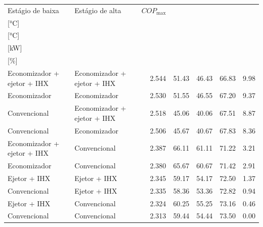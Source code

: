 {\small\setlength{\tabcolsep}{4pt}\renewcommand{\arraystretch}{1.12}
\begin{tabular}{llrrrrr}
\toprule
Estágio de baixa & Estágio de alta & $COP_{\max}$ & \shortstack{$T_{\mathrm{cond,l}}^*$\\{[°C]}} & \shortstack{$T_{\mathrm{evap,h}}^*$\\{[°C]}} & \shortstack{$\dot W_{\mathrm{liq}}$\\{[kW]}} & \shortstack{$\Delta COP_{\mathrm{opt}}$\\{[\%]}} \\
\midrule
Economizador + ejetor + IHX & Economizador + ejetor + IHX & 2.544 & 51.43 & 46.43 & 66.83 & 9.98 \\
Economizador & Economizador & 2.530 & 51.55 & 46.55 & 67.20 & 9.37 \\
Convencional & Economizador + ejetor + IHX & 2.518 & 45.06 & 40.06 & 67.51 & 8.87 \\
Convencional & Economizador & 2.506 & 45.67 & 40.67 & 67.83 & 8.36 \\
Economizador + ejetor + IHX & Convencional & 2.387 & 66.11 & 61.11 & 71.22 & 3.21 \\
Economizador & Convencional & 2.380 & 65.67 & 60.67 & 71.42 & 2.91 \\
Ejetor + IHX & Ejetor + IHX & 2.345 & 59.17 & 54.17 & 72.50 & 1.37 \\
Convencional & Ejetor + IHX & 2.335 & 58.36 & 53.36 & 72.82 & 0.94 \\
Ejetor + IHX & Convencional & 2.324 & 60.25 & 55.25 & 73.16 & 0.46 \\
Convencional & Convencional & 2.313 & 59.44 & 54.44 & 73.50 & 0.00 \\
\bottomrule
\end{tabular}
}
